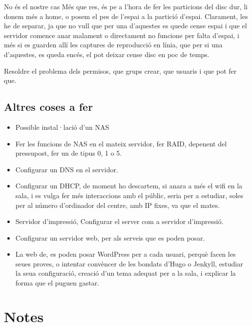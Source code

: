 \documentclass[
  10pt,
]{krantz}
\begin{document}
\begin{rmdnote}{No és el nostre cas}
Més que res, és pe a l'hora de fer les particions del disc dur, li donem més a home, o posem el pes de l'espai a la partició d'espai. Clarament, les he de separar, ja que no vull que per una d'aquestes es quede cense espai i que el servidor comence anar malament o directament no funcione per falta d'espai, i més si es guarden allí les captures de reproducció en línia, que per si una d'aquestes, es queda encés, el pot deixar cense disc en poc de temps.

\end{rmdnote}

Resoldre el problema dels permisos, que grups crear, que usuaris i que pot fer que.

\hypertarget{altres-coses-a-fer}{%
\section{Altres coses a fer}\label{altres-coses-a-fer}}

\begin{itemize}
\item
  Possible instal·lació d'un NAS
\item
  Fer les funcions de NAS en el mateix servidor, fer RAID, depenent del pressupost, fer un de tipus 0, 1 o 5.
\item
  Configurar un DNS en el servidor.
\item
  Configurar un DHCP, de moment ho descartem, si anara a més el wifi en la sala, i es vulga fer més interaccions amb el públic, seria per a estudiar, soles per al número d'ordinador del centre, amb IP fixes, va que el mates.
\item
  Servidor d'impressió, Configurar el server com a servidor d'impressió.
\item
  Configurar un servidor web, per als serveis que es poden posar.
\item
  La web de, es poden posar WordPress per a cada usuari, perquè facen les seues proves, o intentar convèncer de les bondats d'Hugo o Jenkyll, estudiar la seua configuració, creació d'un tema adequat per a la sala, i explicar la forma que el puguen gastar.
\end{itemize}

\hypertarget{notes}{%
\chapter{Notes}\label{notes}}
\end{document}
